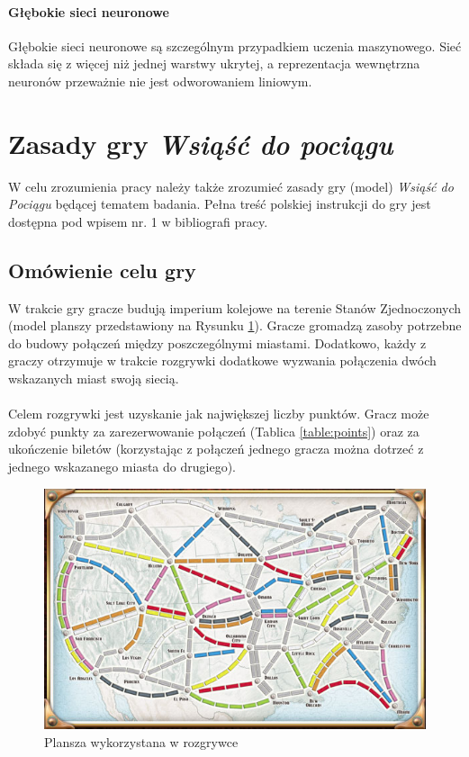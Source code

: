 \documentclass[12pt, oneside]{report}
\begin{document}
\paragraph{Głębokie sieci neuronowe}
Głębokie sieci neuronowe są szczególnym przypadkiem uczenia maszynowego. Sieć składa się z więcej niż jednej warstwy ukrytej, a reprezentacja wewnętrzna neuronów przeważnie nie jest odworowaniem liniowym.
\section{Zasady gry \textit{Wsiąść do pociągu}}
W celu zrozumienia pracy należy także zrozumieć zasady gry (model) \textit{Wsiąść do Pociągu} będącej tematem badania. Pełna treść polskiej instrukcji do gry jest dostępna pod wpisem nr. 1 w bibliografi pracy.
\subsection{Omówienie celu gry}
W trakcie gry gracze budują imperium kolejowe na terenie Stanów Zjednoczonych (model planszy przedstawiony na Rysunku \ref{figure:world map}). Gracze gromadzą zasoby potrzebne do budowy połączeń między poszczególnymi miastami. Dodatkowo, każdy z graczy otrzymuje w trakcie rozgrywki dodatkowe wyzwania połączenia dwóch wskazanych miast swoją siecią. \\ \\
Celem rozgrywki jest uzyskanie jak największej liczby punktów. Gracz może zdobyć punkty za zarezerwowanie połączeń (Tablica  \ref{table:points}) oraz za ukończenie biletów (korzystając z połączeń jednego gracza można dotrzeć z jednego wskazanego miasta do drugiego).
 
\begin{figure}[h]
	\includegraphics[width=\linewidth]{ticket-to-ride-board-map.jpg}
	\caption{Plansza wykorzystana w rozgrywce}
	\label{figure:world map}
\end{figure}
\end{document}
